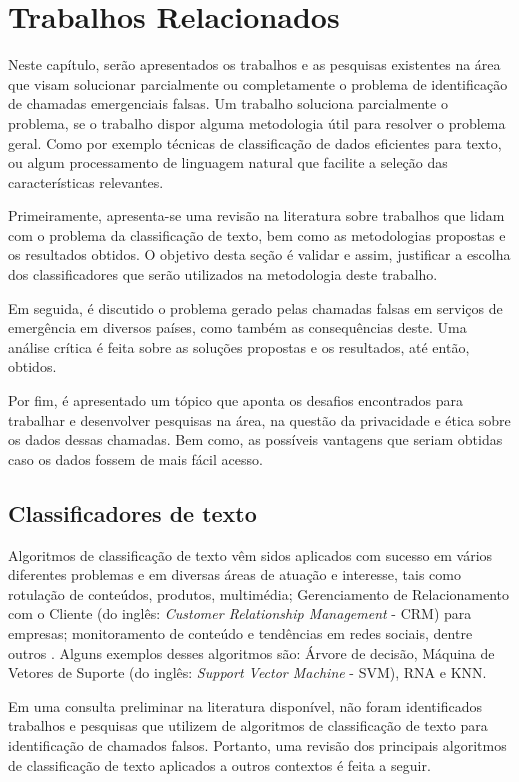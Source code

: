 \chapter{Trabalhos Relacionados}
Neste capítulo, serão apresentados os trabalhos e as pesquisas existentes na área que visam solucionar parcialmente ou completamente o problema de identificação de chamadas emergenciais falsas. Um trabalho soluciona parcialmente o problema, se o trabalho dispor alguma metodologia útil para resolver o problema geral. Como por exemplo técnicas de classificação de dados eficientes para texto, ou algum processamento de linguagem natural que facilite a seleção das características relevantes. 

Primeiramente, apresenta-se uma revisão na literatura sobre trabalhos que lidam com o problema da classificação de texto, bem como as metodologias propostas e os resultados obtidos. O objetivo desta seção é validar e assim, justificar a escolha dos classificadores que serão utilizados na metodologia deste trabalho.

Em seguida, é discutido o problema gerado pelas chamadas falsas em serviços de emergência em diversos países, como também as consequências deste. Uma análise crítica é feita sobre as soluções propostas e os resultados, até então, obtidos.

Por fim, é apresentado um tópico que aponta os desafios encontrados para trabalhar e desenvolver pesquisas na área, na questão da privacidade e ética sobre os dados dessas chamadas. Bem como, as possíveis vantagens que seriam obtidas caso os dados fossem de mais fácil acesso.

\section{Classificadores de texto}
Algoritmos de classificação de texto vêm sidos aplicados com sucesso em vários diferentes problemas e em diversas áreas de atuação e interesse, tais como rotulação de conteúdos, produtos, multimédia; Gerenciamento de Relacionamento com o Cliente (do inglês: \textit{Customer Relationship Management} - CRM) para empresas; monitoramento de conteúdo e tendências em redes sociais, dentre outros \citep{uysal2012novel, gupta2018text}. Alguns exemplos desses algoritmos são: Árvore de decisão, Máquina de Vetores de Suporte (do inglês: \textit{Support Vector Machine} - SVM), RNA e KNN.

Em uma consulta preliminar na literatura disponível, não foram identificados trabalhos e pesquisas que utilizem de algoritmos de classificação de texto para identificação de chamados falsos. Portanto, uma revisão dos principais algoritmos de classificação de texto aplicados a outros contextos é feita a seguir.

